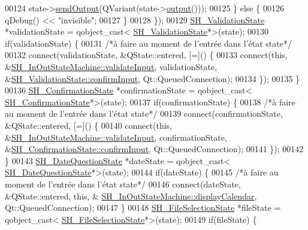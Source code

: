\begin{DoxyCode}
00124             state->\hyperlink{classSH__InOutState_a77921c5f42059bc97361f4ff7827da12}{sendOutput}(QVariant(state->\hyperlink{classSH__InOutState_a17ed7eaf5e3ed5af80a4f9fe65d5bfd9}{output}()));
00125         \} \textcolor{keywordflow}{else} \{
00126             qDebug() << \textcolor{stringliteral}{"invisible"};
00127         \}
00128     \});
00129     \hyperlink{classSH__ValidationState}{SH\_ValidationState} *validationState = qobject\_cast<
      \hyperlink{classSH__ValidationState}{SH\_ValidationState}*>(state);
00130     \textcolor{keywordflow}{if}(validationState) \{
00131         \textcolor{comment}{/*à faire au moment de l'entrée dans l'état state*/}
00132         connect(validationState, &QState::entered, [=]() \{
00133             connect(\textcolor{keyword}{this}, &\hyperlink{classSH__InOutStateMachine_aec1b3fef3c1f82499aa1f73beaecd08a}{SH\_InOutStateMachine::validateInput}, 
      validationState, &\hyperlink{classSH__ConfirmationState_a039267260de5d102ac7511e6a5fae87f}{SH\_ValidationState::confirmInput}, Qt::QueuedConnection);
00134         \});
00135     \}
00136     \hyperlink{classSH__ConfirmationState}{SH\_ConfirmationState} *confirmationState = qobject\_cast<
      \hyperlink{classSH__ConfirmationState}{SH\_ConfirmationState}*>(state);
00137     \textcolor{keywordflow}{if}(confirmationState) \{
00138         \textcolor{comment}{/*à faire au moment de l'entrée dans l'état state*/}
00139         connect(confirmationState, &QState::entered, [=]() \{
00140             connect(\textcolor{keyword}{this}, &\hyperlink{classSH__InOutStateMachine_aec1b3fef3c1f82499aa1f73beaecd08a}{SH\_InOutStateMachine::validateInput}, 
      confirmationState, &\hyperlink{classSH__ConfirmationState_a039267260de5d102ac7511e6a5fae87f}{SH\_ConfirmationState::confirmInput}, Qt::QueuedConnection);
00141         \});
00142     \}
00143     \hyperlink{classSH__DateQuestionState}{SH\_DateQuestionState} *dateState = qobject\_cast<
      \hyperlink{classSH__DateQuestionState}{SH\_DateQuestionState}*>(state);
00144     \textcolor{keywordflow}{if}(dateState) \{
00145         \textcolor{comment}{/*à faire au moment de l'entrée dans l'état state*/}
00146         connect(dateState, &QState::entered, \textcolor{keyword}{this}, &
      \hyperlink{classSH__InOutStateMachine_ab3a12d1f9b658d8ffdc17669a6c065f2}{SH\_InOutStateMachine::displayCalendar}, Qt::QueuedConnection);
00147     \}
00148     \hyperlink{classSH__FileSelectionState}{SH\_FileSelectionState} *fileState = qobject\_cast<
      \hyperlink{classSH__FileSelectionState}{SH\_FileSelectionState}*>(state);
00149     \textcolor{keywordflow}{if}(fileState) \{

\end{DoxyCode}
